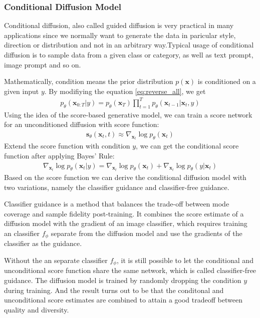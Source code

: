 \documentclass[12pt,DIV14,BCOR12mm,a4paper,footinclude=false,headinclude,parskip=half-,twoside,openright,cleardoublepage=empty,toc=index,bibliography=totoc,listof=totoc]{scrreprt}
\numberwithin{equation}{chapter}
\begin{document}
\subsubsection{Conditional Diffusion Model}
Conditional diffusion, also called guided diffusion is very practical in many applications since we normally want to generate the data in paricular style, direction or distribution and not in an arbitrary way.Typical usage of conditional diffusion is to sample data from a given class or category, as well as text prompt, image prompt and so on.

Mathematically, condition means the prior distribution $p(\mathbf{x})$ is conditioned on a given input $y$. By modifiying the equation \ref{eq:reverse_all}, we get
\begin{align}
  p_{\theta}(\mathbf{x}_{0:T}|y) = p_{\theta}(\mathbf{x}_{T})\prod_{t=1}^{T}p_{\theta}(\mathbf{x}_{t-1}|\mathbf{x}_{t},y)
\end{align}
Using the idea of the score-based generative model\cite{song2020generative}, we can train a score network for an unconditioned diffusion with score function:
\begin{align}
  \mathbf{s}_{\theta}(\mathbf{x}_{t}, t)\approx \nabla _{\mathbf{x}_{t}}\log p_{\theta}(\mathbf{x}_{t})
\end{align}
Extend the score function with condition $y$, we can get the conditional score function after applying Bayes' Rule:
\begin{align}
  \nabla _{\mathbf{x}_{t}}\log p_{\theta}(\mathbf{x}_{t}|y)=\nabla _{\mathbf{x}_{t}}\log p_{\theta}(\mathbf{x}_{t}) + \nabla _{\mathbf{x}_{t}}\log p_{\theta}(y|\mathbf{x}_{t})
\end{align}
Based on the score function we can derive the conditional diffusion model with two variations, namely the classifier guidance and classifier-free guidance.

Classifier guidance is a method that balances the trade-off between mode coverage and sample fidelity post-training. It combines the score estimate of a diffusion model with the gradient of an image classifier, which requires training an classifier $f_{\phi}$ separate from the diffusion model and use the gradients of the classifier as the guidance.

Without the an separate classifier $f_{\phi}$, it is still possible to let the conditional and unconditional score function share the same network, which is called classifier-free guidance. The diffusion model is trained by randomly dropping the condition $y$ during training. And the result turns out to be that the conditonal and unconditional score estimates are combined to attain a good tradeoff between quality and diversity\cite{ho2022classifierfree}.
\end{document}

